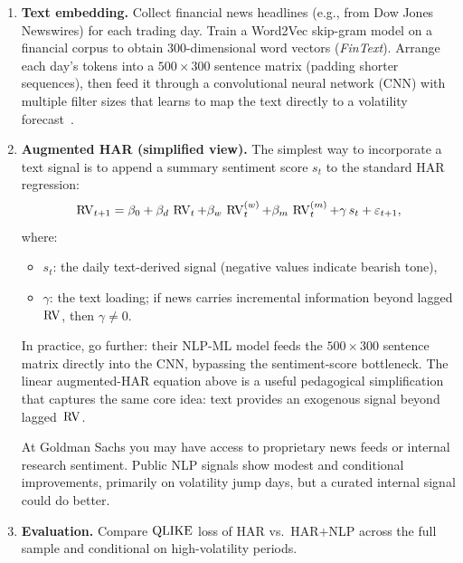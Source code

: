 \begin{enumerate}
  \item \textbf{Text embedding.}  Collect financial news headlines
        (e.g., from Dow Jones Newswires) for each trading day.  Train
        a Word2Vec skip-gram model on a financial corpus to obtain
        300-dimensional word vectors (\emph{FinText}).  Arrange each
        day's tokens into a $500 \times 300$ sentence matrix (padding
        shorter sequences), then feed it through a convolutional neural
        network (CNN) with multiple filter sizes that learns to map
        the text directly to a volatility
        forecast~\citep{RahimikiaZohrenPoon2021NLP}.
  \item \textbf{Augmented HAR (simplified view).}  The simplest way to
        incorporate a text signal is to append a summary sentiment score
        $s_t$ to the standard HAR regression:
        \begin{equation}\label{eq:har-nlp}
          \operatorname{RV}_{t+1} = \beta_0 + \beta_d\,\operatorname{RV}_t
            + \beta_w\,\operatorname{RV}_t^{(w)} + \beta_m\,\operatorname{RV}_t^{(m)}
            + \gamma\,s_t + \varepsilon_{t+1},
        \end{equation}
        where:
        \begin{itemize}
          \item $s_t$: the daily text-derived signal (negative values
                indicate bearish tone),
          \item $\gamma$: the text loading; if news carries
                incremental information beyond lagged $\operatorname{RV}$, then
                $\gamma \neq 0$.
        \end{itemize}
        In practice, \citet{RahimikiaZohrenPoon2021NLP} go further:
        their NLP-ML model feeds the $500 \times 300$ sentence matrix
        directly into the CNN, bypassing the sentiment-score bottleneck.
        The linear augmented-HAR equation above is a useful pedagogical
        simplification that captures the same core idea: text provides
        an exogenous signal beyond lagged~$\operatorname{RV}$.

        \begin{projectconnection}
        At Goldman Sachs you may have access to proprietary news feeds
        or internal research sentiment.  Public NLP signals show modest
        and conditional improvements, primarily on volatility jump
        days, but a curated internal signal could do better.
        \end{projectconnection}

  \item \textbf{Evaluation.}  Compare $\operatorname{QLIKE}$ loss of HAR vs.\
        HAR$+$NLP across the full sample and conditional on high-volatility
        periods.
\end{enumerate}

